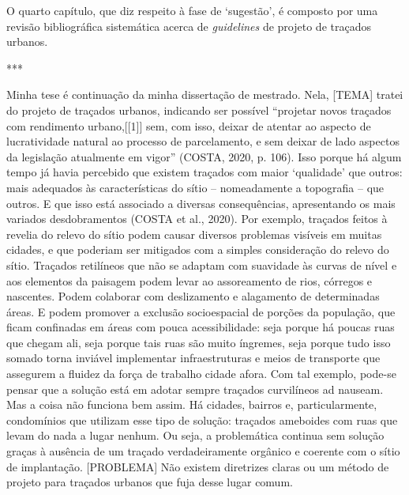 \documentclass[]{report}
\begin{document}
	O quarto capítulo, que diz respeito à fase de `sugestão', é composto por uma revisão bibliográfica sistemática acerca de \textit{guidelines} de projeto de traçados urbanos.

	***

		

	Minha tese é continuação da minha dissertação de mestrado. Nela, [TEMA] tratei do projeto de traçados urbanos, indicando ser possível “projetar novos traçados com rendimento urbano,[[1]] sem, com isso, deixar de atentar ao aspecto de lucratividade natural ao processo de parcelamento, e sem deixar de lado aspectos da legislação atualmente em vigor” (COSTA, 2020, p. 106). Isso porque há algum tempo já havia percebido que existem traçados com maior ‘qualidade’ que outros: mais adequados às características do sítio – nomeadamente a topografia – que outros. E que isso está associado a diversas consequências, apresentando os mais variados desdobramentos (COSTA et al., 2020). Por exemplo, traçados feitos à revelia do relevo do sítio podem causar diversos problemas visíveis em muitas cidades, e que poderiam ser mitigados com a simples consideração do relevo do sítio. Traçados retilíneos que não se adaptam com suavidade às curvas de nível e aos elementos da paisagem podem levar ao assoreamento de rios, córregos e nascentes. Podem colaborar com deslizamento e alagamento de determinadas áreas. E podem promover a exclusão socioespacial de porções da população, que ficam confinadas em áreas com pouca acessibilidade: seja porque há poucas ruas que chegam ali, seja porque tais ruas são muito íngremes, seja porque tudo isso somado torna inviável implementar infraestruturas e meios de transporte que assegurem a fluidez da força de trabalho cidade afora. Com tal exemplo, pode-se pensar que a solução está em adotar sempre traçados curvilíneos ad nauseam. Mas a coisa não funciona bem assim. Há cidades, bairros e, particularmente, condomínios que utilizam esse tipo de solução: traçados ameboides com ruas que levam do nada a lugar nenhum. Ou seja, a problemática continua sem solução graças à ausência de um traçado verdadeiramente orgânico e coerente com o sítio de implantação. [PROBLEMA] Não existem diretrizes claras ou um método de projeto para traçados urbanos que fuja desse lugar comum.
\end{document}
